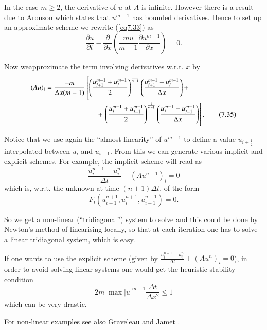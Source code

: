 In the case $m \geq 2$, the derivative of $u$ at $A$ is
infinite. However there is a result due to Aronson \cite{key3} which
states that $u^{m-1}$ has bounded derivatives. Hence to set up an
approximate scheme we rewrite (\ref{eq7.33}) as  
\begin{equation*}
\frac{\partial u}{\partial t} - \frac{\partial}{\partial x}
\left(\frac{mu}{m-1} \frac{\partial u^{m-1}}{\partial x}\right) =
0.\tag{7.34}\label{eq7.34} 
\end{equation*}

Now we\pageoriginale approximate the term involving derivatives w.r.t. $x$ by
\begin{align*}
(Au)_i & = \frac{-m}{\Delta x(m-1)} \left[ \left(\frac{u^{m-1}_{i+1} +
      u^{m-1}_i}{2}\right)^{\frac{1}{m-1}} \left(\frac{u^{m-1}_{i+1} -
      u^{m-1}_{i}}{\Delta x}\right)+ \right.\\  
& \hspace{2.5cm} + \left. \left(\frac{u^{m-1}_i +
      u^{m-1}_{i-1}}{2}\right)^{\frac{1}{m-1}} 
    \left(\frac{u^{m-1}_i - u^{m-1}_{i-1}}{\Delta x}\right)
    \right]. \tag{7.35} \label{eq7.35} 
\end{align*}

Notice that we use again the ``almost linearity'' of $u^{m-1}$ to
define a value $u_{i+\frac{1}{2}}$ interpolated between $u_i$ and
$u_{i+1}$. From this we can generate various implicit and explicit
schemes. For example, the implicit scheme will read as 
\begin{equation*}
\frac{u^{n-1}_i - u^n_i}{\Delta t} + (Au^{n+1})_i = 0
\tag{7.36}\label{eq7.36}
\end{equation*}
which is, w.r.t. the unknown at time $(n+1)\Delta t$, of the form 
\begin{equation*}
F_i (u^{n+1}_{i+1},u^{n+1}_i, u^{n+1}_{i-1}) = 0.
\tag{7.37}\label{eq7.37}
\end{equation*}

So we get a non-linear (``tridiagonal'') system to solve and this
could be done by Newton's method of linearising locally, so that at
each iteration one has to solve a linear tridiagonal system, which is
easy. 

If one wants to use the explicit scheme (given by $\frac{u^{n+1}_i -
  u^n_i}{\Delta t} + (Au^n)_i = 0$), in order to avoid solving linear
systems one would get the heuristic stability condition 
\begin{equation*}
2m \; \max |u|^{m-1} \frac{\Delta t}{\Delta x^2} \leq 1\tag{7.38}\label{eq7.38}
\end{equation*}
which can be very drastic.

For non-linear examples see also Graveleau and Jamet \cite{key14}.
